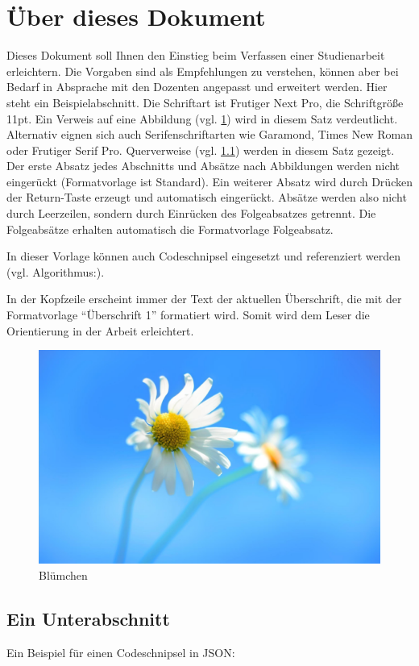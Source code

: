 \section{Über dieses Dokument}
Dieses Dokument soll Ihnen den Einstieg beim Verfassen einer Studienarbeit erleichtern. Die Vorgaben sind als Empfehlungen zu verstehen, können aber bei Bedarf in Absprache mit den Dozenten angepasst und erweitert werden. Hier steht ein Beispielabschnitt. Die Schriftart ist Frutiger Next Pro, die 
Schriftgröße 11pt. Ein Verweis auf eine Abbildung (vgl. \cref{fig:norman2002}) wird in diesem Satz verdeutlicht. Alternativ eignen sich auch Serifenschriftarten wie Garamond, Times New Roman oder Frutiger Serif Pro. Querverweise (vgl. \cref{sec:ein-unterabschnitt}) werden in diesem Satz  gezeigt. Der erste Absatz jedes Abschnitts und Absätze nach Abbildungen werden nicht eingerückt (Formatvorlage ist Standard). Ein weiterer Absatz wird durch Drücken der Return-Taste erzeugt und automatisch eingerückt. Absätze werden also nicht durch Leerzeilen, sondern durch Einrücken des Folgeabsatzes getrennt. Die Folgeabsätze erhalten automatisch die Formatvorlage Folgeabsatz.

In dieser Vorlage können auch Codeschnipsel eingesetzt und referenziert werden (vgl. Algorithmus:).

In der Kopfzeile erscheint immer der Text der aktuellen Überschrift, die mit der Formatvorlage \enquote{Überschrift 1} formatiert wird. Somit wird dem Leser die Orientierung in der Arbeit erleichtert.
\begin{figure}[htbp]
	\centering
	\includegraphics{images/demo}
	\caption{Blümchen \autocite{Norman:2002}}
	\label{fig:norman2002}
\end{figure}

\subsection{Ein Unterabschnitt}\label{sec:ein-unterabschnitt}
Ein Beispiel für einen Codeschnipsel in JSON:
\lstset{
	language=JSON,
}

